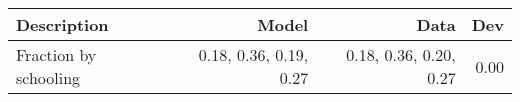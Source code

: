\begin{tabular}{lrrr}
\hline
Description & Model  & Data  & Dev  \\ 
\hline
Fraction by schooling & 0.18, 0.36, 0.19, 0.27  & 0.18, 0.36, 0.20, 0.27  & 0.00  \\ 
\hline
\end{tabular}%
